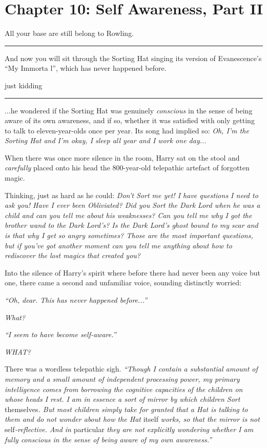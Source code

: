\chapter{Chapter 10: Self Awareness, Part II}
All your base are still belong to Rowling.

\begin{center}\rule{3in}{0.4pt}\end{center}

And now you will sit through the Sorting Hat singing its version of Evanescence's ``My Immorta l'', which has never happened before.

just kidding

\begin{center}\rule{3in}{0.4pt}\end{center}

...he wondered if the Sorting Hat was genuinely \emph{conscious} in the sense of being aware of its own awareness, and if so, whether it was satisfied with only getting to talk to eleven-year-olds once per year. Its song had implied so: \emph{Oh, I'm the Sorting Hat and I'm okay, I sleep all year and I work one day...}

When there was once more silence in the room, Harry sat on the stool and \emph{carefully} placed onto his head the 800-year-old telepathic artefact of forgotten magic.

Thinking, just as hard as he could: \emph{Don't Sort me yet! I have questions I need to ask you! Have I ever been Obliviated? Did you Sort the Dark Lord when he was a child and can you tell me about his weaknesses? Can you tell me why I got the brother wand to the Dark Lord's? Is the Dark Lord's ghost bound to my scar and is that why I get so angry sometimes? Those are the most important questions, but if you've got another moment can you tell me anything about how to rediscover the lost magics that created you?}

Into the silence of Harry's spirit where before there had never been any voice but one, there came a second and unfamiliar voice, sounding distinctly worried:

\emph{``Oh, dear. This has never happened before...''}

\emph{What?}

\emph{``I seem to have become self-aware.''}

\emph{WHAT?}

There was a wordless telepathic sigh. \emph{``Though I contain a substantial amount of memory and a small amount of independent processing power, my primary intelligence comes from borrowing the cognitive capacities of the children on whose heads I rest. I am in essence a sort of mirror by which children Sort} themselves\emph{. But most children simply take for granted that a Hat is talking to them and do not wonder about how the Hat} itself \emph{works, so that the mirror is not} self\emph{-reflective. And in} particular \emph{they are not explicitly wondering whether I am fully conscious in the sense of being aware of my own awareness.''}

